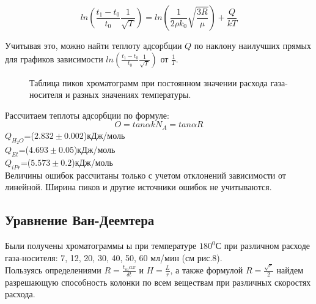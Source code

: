 \documentclass[12pt]{article}
\begin{document}
\begin{flushleft}
\begin{equation}
 ln(\frac{t_1-t_0}{t_0} \frac{1}{\sqrt{T}}) = ln(\frac{1}{2\rho k_0} \sqrt{\frac{3R}{\mu}}) + \frac{Q}{kT}
\end{equation}

Учитывая это, можно найти теплоту адсорбции $Q$ по наклону наилучших прямых для графиков зависимости $ln(\frac{t_1-t_0}{t_0} \frac{1}{\sqrt{T}})$ от $\frac{1}{T}$.\\
\begin{figure}[!h]
\caption{Таблица пиков хроматограмм при постоянном значении расхода газа-носителя и разных значениях температуры.}
\label{ris:image}
\end{figure}
\newpage
Рассчитаем теплоты адсорбции по формуле:
\begin{equation}
O=tan  \alpha kN_A = tan \alpha R
\end{equation}
$Q_{H_2O}$=($2.832 \pm 0.002$)кДж/моль\\
$Q_{Et}$=($4.693 \pm 0.05$)кДж/моль\\
$Q_{iPr}$=($5.573 \pm 0.2$)кДж/моль\\
Величины ошибок рассчитаны только с учетом отклонений зависимости от линейной.
Ширина пиков и другие источники ошибок не учитываются.

\subsection{Уравнение Ван-Деемтера}
Были получены хроматограммы ы при температуре $180^0$С при различном расходе
газа-носителя: 7, 12, 20, 30, 40, 50, 60 мл/мин (см рис.8).\\
Пользуясь определениями $R=\frac{t_max}{\delta t}$ и $H =\frac{L}{r}$, а также формулой $R=\frac{\sqrt{r}}{2}$ найдем разрешающую способность колонки по всем веществам при различных скоростях расхода.


\end{flushleft}
\end{document}
